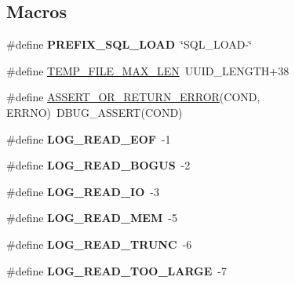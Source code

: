 \subsection*{Macros}
\begin{DoxyCompactItemize}
\item 
\mbox{\label{group__Replication_gadacb4be8ef1d9b672757fd254e8a667c}} 
\#define {\bfseries P\+R\+E\+F\+I\+X\+\_\+\+S\+Q\+L\+\_\+\+L\+O\+AD}~\char`\"{}S\+Q\+L\+\_\+\+L\+O\+AD-\/\char`\"{}
\item 
\#define \mbox{\hyperlink{group__Replication_gaa195d0860b5c2a3a40362544ec720e70}{T\+E\+M\+P\+\_\+\+F\+I\+L\+E\+\_\+\+M\+A\+X\+\_\+\+L\+EN}}~U\+U\+I\+D\+\_\+\+L\+E\+N\+G\+TH+38
\item 
\#define \mbox{\hyperlink{group__Replication_ga4ebc2b131b4e1bdb6c0be57e4589851a}{A\+S\+S\+E\+R\+T\+\_\+\+O\+R\+\_\+\+R\+E\+T\+U\+R\+N\+\_\+\+E\+R\+R\+OR}}(C\+O\+ND,  E\+R\+R\+NO)~D\+B\+U\+G\+\_\+\+A\+S\+S\+E\+RT(C\+O\+ND)
\item 
\mbox{\label{group__Replication_ga7a4145c1e8d3701b462f1ad6bc2bf0a4}} 
\#define {\bfseries L\+O\+G\+\_\+\+R\+E\+A\+D\+\_\+\+E\+OF}~-\/1
\item 
\mbox{\label{group__Replication_ga619614abc7a78783e9e479f230fe5055}} 
\#define {\bfseries L\+O\+G\+\_\+\+R\+E\+A\+D\+\_\+\+B\+O\+G\+US}~-\/2
\item 
\mbox{\label{group__Replication_gaa6af69e984c46057aa85370a2096556a}} 
\#define {\bfseries L\+O\+G\+\_\+\+R\+E\+A\+D\+\_\+\+IO}~-\/3
\item 
\mbox{\label{group__Replication_gad5ae28701121bb80f1e7e2ce7eaf50b4}} 
\#define {\bfseries L\+O\+G\+\_\+\+R\+E\+A\+D\+\_\+\+M\+EM}~-\/5
\item 
\mbox{\label{group__Replication_gaa4a70704f45545d2e30e658ceb630b46}} 
\#define {\bfseries L\+O\+G\+\_\+\+R\+E\+A\+D\+\_\+\+T\+R\+U\+NC}~-\/6
\item 
\mbox{\label{group__Replication_ga2dc5b11d5d2d7f8f12a7618622ea64fb}} 
\#define {\bfseries L\+O\+G\+\_\+\+R\+E\+A\+D\+\_\+\+T\+O\+O\+\_\+\+L\+A\+R\+GE}~-\/7
\item 

\end{DoxyCompactItemize}
